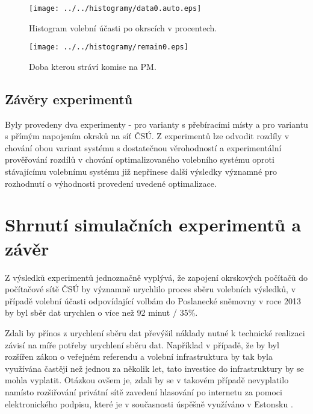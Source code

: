 \documentclass[12pt,a4paper,titlepage,final]{article}
\begin{document}
\begin{figure}[H]
\centering
\begin{minipage}{.49\textwidth}
  \centering
  \texttt{[image: ../../histogramy/data0.auto.eps]}
  \caption{Histogram volební účasti po okrscích v procentech.}
  \label{fig:data0}
\end{minipage}
\hfill
\begin{minipage}{.49\textwidth}
  \centering
  \texttt{[image: ../../histogramy/remain0.eps]}
  \caption{Doba kterou stráví komise na PM.}
  \label{fig:remain0}
\end{minipage}
\end{figure}

\subsection{Závěry experimentů}

Byly provedeny dva experimenty - pro varianty s přebíracími místy a pro variantu s přímým napojením okrsků na síť ČSÚ. Z experimentů lze odvodit rozdíly v chování obou variant systému s dostatečnou věrohodností a experimentální prověřování rozdílů v chování optimalizovaného volebního systému oproti stávajícímu volebnímu systému již nepřinese další výsledky významné pro rozhodnutí o výhodnosti provedení uvedené optimalizace.

\section{Shrnutí simulačních experimentů a závěr} \label{zaver}

Z výsledků experimentů jednoznačně vyplývá, že zapojení okrskových počítačů do počítačové sítě ČSÚ by významně urychlilo proces sběru volebních výsledků, v případě volební účasti odpovídající volbám do Poslanecké sněmovny v roce 2013 by byl sběr dat urychlen o více než 92 minut / 35\%.

Zdali by přínos z urychlení sběru dat převýšil náklady nutné k technické realizaci závisí na míře potřeby urychlení sběru dat. Například v případě, že by byl rozšířen zákon o veřejném referendu a volební infrastruktura by tak byla využívána častěji než jednou za několik let, tato investice do infrastruktury by se mohla vyplatit. Otázkou ovšem je, zdali by se v takovém případě nevyplatilo namísto rozšiřování privátní sítě zavedení hlasování po internetu za pomoci elektronického podpisu, které je v současnosti úspěšně využíváno v Estonsku \cite{estonsko}.
\end{document}
